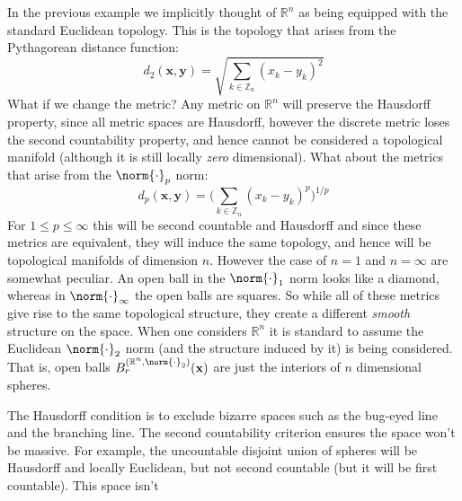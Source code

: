 \documentclass{article}                                                        %
\begin{document}
        \begin{example}
            In the previous example we implicitly thought of $\mathbb{R}^{n}$ as
            being equipped with the standard Euclidean topology. This is the
            topology that arises from the Pythagorean distance function:
            \begin{equation}
                d_{2}(\mathbf{x},\mathbf{y})=
                \sqrt{\sum_{k\in\mathbb{Z}_{n}}(x_{k}-y_{k})^{2}}
            \end{equation}
            What if we change the metric? Any metric on $\mathbb{R}^{n}$ will
            preserve the Hausdorff property, since all metric spaces are
            Hausdorff, however the discrete metric loses the second countability
            property, and hence cannot be considered a topological manifold
            (although it is still locally \textit{zero} dimensional). What about
            the metrics that arise from the $\norm{\cdot}_{p}$ norm:
            \begin{equation}
                d_{p}(\mathbf{x},\mathbf{y})=
                \Big(\sum_{k\in\mathbb{Z}_{n}}(x_{k}-y_{k})^{p}\Big)^{1/p}
            \end{equation}
            For $1\leq{p}\leq\infty$ this will be second countable and Hausdorff
            and since these metrics are equivalent, they will induce the same
            topology, and hence will be topological manifolds of dimension $n$.
            However the case of $n=1$ and $n=\infty$ are somewhat peculiar. An
            open ball in the $\norm{\cdot}_{1}$ norm looks like a diamond,
            whereas in $\norm{\cdot}_{\infty}$ the open balls are squares. So
            while all of these metrics give rise to the same topological
            structure, they create a different \textit{smooth} structure on the
            space. When one considers $\mathbb{R}^{n}$ it is standard to assume
            the Euclidean $\norm{\cdot}_{2}$ norm (and the structure induced by
            it) is being considered. That is, open balls
            $B_{r}^{(\mathbb{R}^{n},\norm{\cdot}_{2})}(\mathbf{x})$ are just the
            interiors of $n$ dimensional spheres.
        \end{example}
        The Hausdorff condition is to exclude bizarre spaces such as the
        bug-eyed line and the branching line. The second countability criterion
        ensures the space won't be massive. For example, the uncountable
        disjoint union of spheres will be Hausdorff and locally Euclidean, but
        not second countable (but it will be first countable). This space isn't
\end{document}
